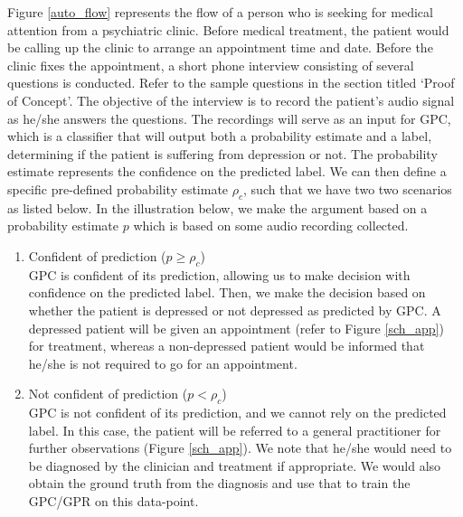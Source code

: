 \documentclass{article}
\begin{document}
Figure \ref{auto_flow} represents the flow of a person who is seeking for medical attention from a psychiatric clinic.
    Before medical treatment, the patient would be calling up the clinic to arrange an appointment time and date. 
    Before the clinic fixes the appointment, a short phone interview consisting of several questions is conducted.
    Refer to the sample questions in the section titled `Proof of Concept'.
    The objective of the interview is to record the patient's audio signal as he/she answers the questions.
    The recordings will serve as an input for GPC, which is a classifier that will output both a probability estimate and a label, determining if the patient is suffering from depression or not.
    The probability estimate represents the confidence on the predicted label. 
    We can then define a specific pre-defined probability estimate $\rho_c$, such that we have two two scenarios as listed below. 
    In the illustration below, we make the argument based on a probability estimate $p$ which is based on some audio recording collected.
    
    \begin{enumerate}
        \item {Confident of prediction ($p \geq \rho_c$)} \\
        GPC is confident of its prediction, allowing us to make decision with confidence on the predicted label.
        Then, we make the decision based on whether the patient is depressed or not depressed as predicted by GPC. 
        A depressed patient will be given an appointment (refer to Figure \ref{sch_app}) for treatment, whereas a non-depressed patient would be informed that he/she is not required to go for an appointment.
        \item {Not confident of prediction ($p < \rho_c$}) \\
        GPC is not confident of its prediction, and we cannot rely on the predicted label. 
        In this case, the patient will be referred to a general practitioner for further observations (Figure \ref{sch_app}). 
        We note that he/she would need to be diagnosed by the clinician and treatment if appropriate. 
        We would also obtain the ground truth from the diagnosis and use that to train the GPC/GPR on this data-point. 
    \end{enumerate}
    
\end{document}
